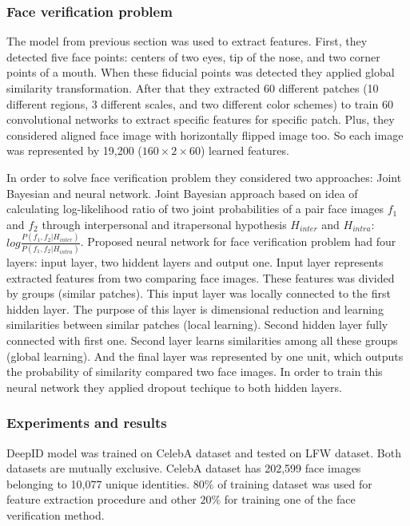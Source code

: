 \documentclass[paper=a4, fontsize=11pt]{scrartcl} %
\numberwithin{equation}{section} %
\numberwithin{figure}{section} %
\numberwithin{table}{section} %
\begin{document}
\subsubsection{Face verification problem}

The model from previous section was used to extract features. First, they detected five face points: centers of two eyes, tip of the nose, and two corner points of a mouth. When these fiducial points was detected they applied global similarity transformation. After that they extracted 60 different patches (10 different regions, 3 different scales, and two different color schemes) to train 60 convolutional networks to extract specific features for specific patch. Plus, they considered aligned face image with horizontally flipped image too. So each image was represented by 19,200 ($160\times2\times60$) learned features. \par

In order to solve face verification problem they considered two approaches: Joint Bayesian and neural network. Joint Bayesian approach based on idea of calculating log-likelihood ratio of two joint probabilities of a pair face images $f_1$ and $f_2$ through interpersonal and itrapersonal hypothesis $H_{inter}$ and $H_{intra}$: $log \frac{P(f_1, f_2 | H_{inter})}{P(f_1, f_2 | H_{intra})}$. Proposed neural network for face verification problem had four layers: input layer, two hiddent layers and output one. Input layer represents extracted features from two comparing face images. These features was divided by groups (similar patches). This input layer was locally connected to the first hidden layer. The purpose of this layer is dimensional reduction and learning similarities between similar patches (local learning). Second hidden layer fully connected with first one. Second layer learns similarities among all these groups (global learning). And the final layer was represented by one unit, which outputs the probability of similarity compared two face images. In order to train this neural network they applied dropout techique to both hidden layers.

\subsubsection{Experiments and results}

DeepID model was trained on CelebA \cite{liu2015faceattributes} dataset and tested on LFW dataset. Both datasets are mutually exclusive. CelebA dataset has 202,599 face images belonging to 10,077 unique identities. $80\%$ of training dataset was used for feature extraction procedure and other $20\%$ for training one of the face verification method. \par
\end{document}
